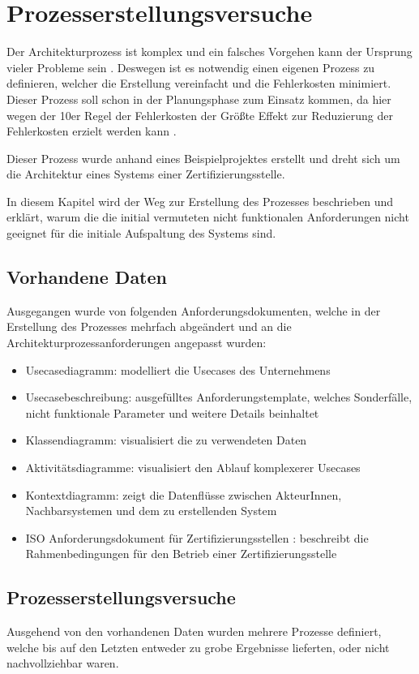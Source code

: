 \chapter{Prozesserstellungsversuche}
Der Architekturprozess ist komplex und ein falsches Vorgehen kann der Ursprung vieler Probleme sein \cite[S. 7-8]{softarch}. Deswegen ist es notwendig einen eigenen Prozess zu definieren, welcher die Erstellung vereinfacht und die Fehlerkosten minimiert. Dieser Prozess soll schon in der Planungsphase zum Einsatz kommen, da hier wegen der 10er Regel der Fehlerkosten der Größte Effekt zur Reduzierung der Fehlerkosten erzielt werden kann \cite[S. 154]{fehler}.

Dieser Prozess wurde anhand eines Beispielprojektes erstellt und dreht sich um die Architektur eines Systems einer Zertifizierungsstelle.

In diesem Kapitel wird der Weg zur Erstellung des Prozesses beschrieben und erklärt, warum die die initial vermuteten nicht funktionalen Anforderungen nicht geeignet für die initiale Aufspaltung des Systems sind.

\section{Vorhandene Daten}
Ausgegangen wurde von folgenden Anforderungsdokumenten, welche in der Erstellung des Prozesses mehrfach abgeändert und an die Architekturprozessanforderungen angepasst wurden:

\begin{itemize}
  \item Usecasediagramm: modelliert die Usecases des Unternehmens
  \item Usecasebeschreibung: ausgefülltes Anforderungstemplate, welches Sonderfälle, nicht funktionale Parameter und weitere Details beinhaltet
  \item Klassendiagramm: visualisiert die zu verwendeten Daten
  \item Aktivitätsdiagramme: visualisiert den Ablauf komplexerer Usecases
  \item Kontextdiagramm: zeigt die Datenflüsse zwischen AkteurInnen, Nachbarsystemen und dem zu erstellenden System
  \item ISO Anforderungsdokument für Zertifizierungsstellen \cite{ISO_CERT}: beschreibt die Rahmenbedingungen für den Betrieb einer Zertifizierungsstelle
\end{itemize}


\section{Prozesserstellungsversuche}
Ausgehend von den vorhandenen Daten wurden mehrere Prozesse definiert, welche bis auf den Letzten entweder zu grobe Ergebnisse lieferten, oder nicht nachvollziehbar waren.


